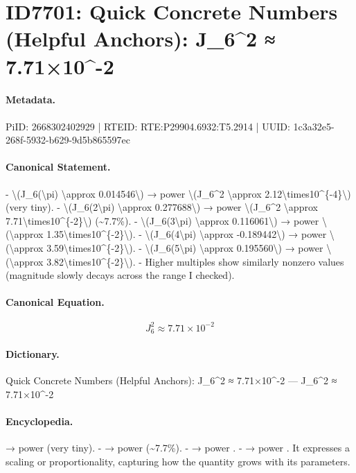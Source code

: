 \section*{ID7701: Quick Concrete Numbers (Helpful Anchors): J\_6\textasciicircum{}2 ≈ 7.71×10\textasciicircum{}-2}
\paragraph{Metadata.}
PiID: 2668302402929 | RTEID: RTE:P29904.6932:T5.2914 | UUID: 1c3a32e5-268f-5932-b629-9d5b865597ec

\paragraph{Canonical Statement.}
- \textbackslash{}(J\_6(\textbackslash{}pi) \textbackslash{}approx 0.014546\textbackslash{}) → power \textbackslash{}(J\_6\textasciicircum{}2 \textbackslash{}approx 2.12\textbackslash{}times10\textasciicircum{}\{-4\}\textbackslash{}) (very tiny). - \textbackslash{}(J\_6(2\textbackslash{}pi) \textbackslash{}approx 0.277688\textbackslash{}) → power \textbackslash{}(J\_6\textasciicircum{}2 \textbackslash{}approx 7.71\textbackslash{}times10\textasciicircum{}\{-2\}\textbackslash{}) (\textasciitilde{}7.7\%). - \textbackslash{}(J\_6(3\textbackslash{}pi) \textbackslash{}approx 0.116061\textbackslash{}) → power \textbackslash{}(\textbackslash{}approx 1.35\textbackslash{}times10\textasciicircum{}\{-2\}\textbackslash{}). - \textbackslash{}(J\_6(4\textbackslash{}pi) \textbackslash{}approx -0.189442\textbackslash{}) → power \textbackslash{}(\textbackslash{}approx 3.59\textbackslash{}times10\textasciicircum{}\{-2\}\textbackslash{}). - \textbackslash{}(J\_6(5\textbackslash{}pi) \textbackslash{}approx 0.195560\textbackslash{}) → power \textbackslash{}(\textbackslash{}approx 3.82\textbackslash{}times10\textasciicircum{}\{-2\}\textbackslash{}). - Higher multiples show similarly nonzero values (magnitude slowly decays across the range I checked).

\paragraph{Canonical Equation.}
\[
J_6^2 \approx 7.71\times10^{-2}
\]

\paragraph{Dictionary.}
Quick Concrete Numbers (Helpful Anchors): J\_6\textasciicircum{}2 ≈ 7.71×10\textasciicircum{}-2 — J\_6\textasciicircum{}2 ≈ 7.71×10\textasciicircum{}-2

\paragraph{Encyclopedia.}
→ power (very tiny). - → power (\textasciitilde{}7.7\%). - → power . - → power . It expresses a scaling or proportionality, capturing how the quantity grows with its parameters.
